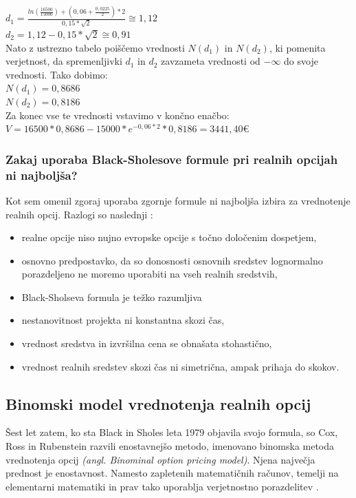 $d_1 = \tfrac{ln(\tfrac{16500}{15000}) + (0,06 + \tfrac{0,0225}{2})* 2}{0,15* \sqrt{2}} \cong 1,12$\\[0,5 cm]
$d_2 = 1,12 - 0,15 * \sqrt{2} \cong 0,91$ \\

Nato z ustrezno tabelo poiščemo vrednosti $N(d_1)$ in $N(d_2)$, ki pomenita verjetnost, da spremenljivki $d_1$ in $d_2$ zavzameta vrednosti od $-\infty$ do svoje vrednosti. Tako dobimo:\\
$N(d_1) = 0,8686$\\
$N(d_2) = 0,8186$\\

Za konec vse te vrednosti vstavimo v končno enačbo:\\
$V = 16500 * 0,8686 - 15000 * e^{-0,06*2} * 0,8186 = 3441,40$€\\

\subsubsection{Zakaj uporaba Black-Sholesove formule pri realnih opcijah ni najboljša?}
Kot sem omenil zgoraj uporaba zgornje formule ni najboljša izbira za vrednotenje realnih opcij. Razlogi so naslednji \cite[str. 48, 49]{Brach}:
\begin{itemize}
\item realne opcije niso nujno evropske opcije s točno določenim dospetjem,
\item osnovno predpostavko, da so donosnosti osnovnih sredstev lognormalno porazdeljeno ne moremo uporabiti na vseh realnih sredstvih,
\item Black-Sholseva formula je težko razumljiva
\item nestanovitnost projekta ni konstantna skozi čas,
\item vrednost sredstva in izvršilna cena se obnašata stohastično,
\item vrednost realnih sredstev skozi čas ni simetrična, ampak prihaja do skokov.
\end{itemize}

\subsection{Binomski model vrednotenja realnih opcij}
Šest let zatem, ko sta Black in Sholes leta 1979 objavila svojo formula, so Cox, Ross in Rubenstein razvili enostavnejšo metodo, imenovano binomska metoda vrednotenja opcij \textit{(angl. Binominal option pricing model)}. Njena največja prednost je enostavnost. Namesto zapletenih matematičnih računov, temelji na elementarni matematiki in prav tako uporablja verjetnostno porazdelitev \cite[str. 52]{Brach}. \\

